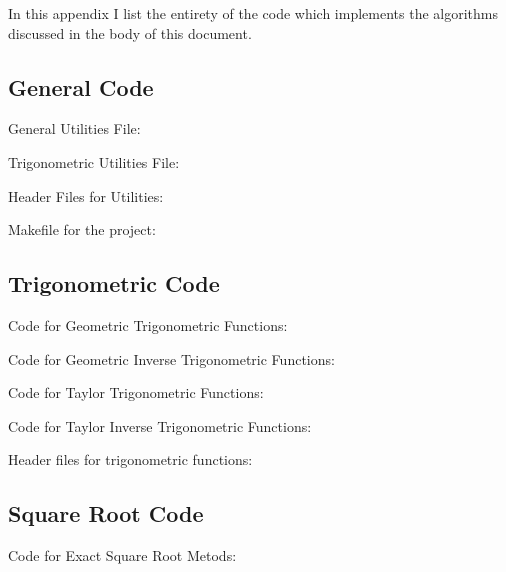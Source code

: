 \renewcommand{\thelstlisting}{}
\renewcommand{\lstlistingname}{File}

In this appendix I list the entirety of the code which implements the algorithms discussed in the body of this document.

\subsection{General Code}
General Utilities File:


Trigonometric Utilities File:


Header Files for Utilities:



Makefile for the project:


\subsection{Trigonometric Code}
Code for Geometric Trigonometric Functions:


Code for Geometric Inverse Trigonometric Functions:


Code for Taylor Trigonometric Functions:


Code for Taylor Inverse Trigonometric Functions:


Header files for trigonometric functions:





\subsection{Square Root Code}
Code for Exact Square Root Metods:


